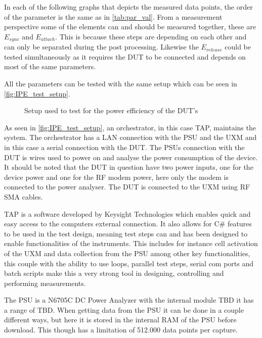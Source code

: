 In each of the following graphs that depicts the measured data points, the order of the parameter is the same as in \autoref{tab:par_val}. From a measurement perspective some of the elements can and should be measured together, these are $E_{sync}$ and $E_{attach}$. This is because these steps are depending on each other and can only be separated during the  post processing. Likewise the $E_{release}$ could be tested simultaneously as it requires the DUT to be connected and depends on most of the same parameters.  




All the parameters can be tested with the same setup which can be seen in \autoref{fig:IPE_test_setup}.

\begin{figure}[H]
\centering

\caption{Setup used to test for the power efficiency of the \gls{DUT}'s}
\label{fig:IPE_test_setup}
\end{figure}


As seen in \autoref{fig:IPE_test_setup}, an orchestrator, in this case \gls{TAP}, maintains the system. The orchestrator has a \gls{LAN} connection with the \gls{PSU} and the UXM and in this case a serial connection with the DUT. The \gls{PSU}s connection with the DUT is wires used to power on and analyse the power consumption of the device. It should be noted that the \gls{DUT} in question have two power inputs, one for the device power and one for the RF modem power, here only the modem is connected to the power analyser. The DUT is connected to the UXM using RF SMA cables.

\gls{TAP} is a software developed by Keysight Technologies which enables quick and easy access to the computers external connection. It also allows for C\# features to be used in the test design, meaning test steps can and has been designed to enable functionalities of the instruments. This includes for instance cell activation of the UXM and data collection from the PSU among other key functionalities, this couple with the ability to use loops, parallel test steps, serial com ports and batch scripts make this a very strong tool in designing, controlling and performing measurements. \citep{TAP} 

The \gls{PSU} is a N6705C DC Power Analyzer with the internal module TBD it has a range of TBD. When getting data from the PSU it can be done in a couple different ways, but here it is stored in the internal RAM of the PSU before download. This though has a limitation of 512.000 data points per capture. \citep{PSU}

